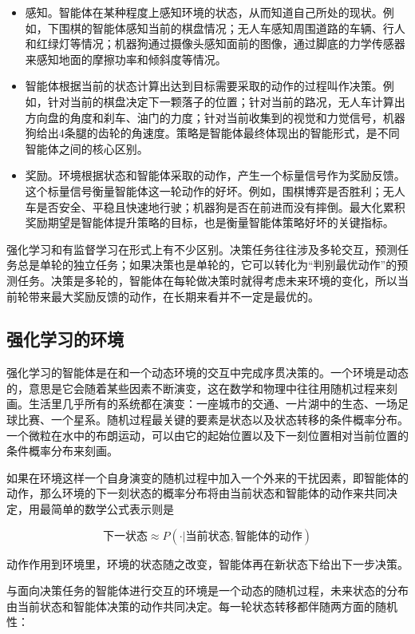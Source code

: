 \begin{itemize}
  \item 感知。智能体在某种程度上感知环境的状态，从而知道自己所处的现状。例如，下围棋的智能体感知当前的棋盘情况；无人车感知周围道路的车辆、行人和红绿灯等情况；机器狗通过摄像头感知面前的图像，通过脚底的力学传感器来感知地面的摩擦功率和倾斜度等情况。
  \item 智能体根据当前的状态计算出达到目标需要采取的动作的过程叫作决策。例如，针对当前的棋盘决定下一颗落子的位置；针对当前的路况，无人车计算出方向盘的角度和刹车、油门的力度；针对当前收集到的视觉和力觉信号，机器狗给出4条腿的齿轮的角速度。策略是智能体最终体现出的智能形式，是不同智能体之间的核心区别。
  \item 奖励。环境根据状态和智能体采取的动作，产生一个标量信号作为奖励反馈。这个标量信号衡量智能体这一轮动作的好坏。例如，围棋博弈是否胜利；无人车是否安全、平稳且快速地行驶；机器狗是否在前进而没有摔倒。最大化累积奖励期望是智能体提升策略的目标，也是衡量智能体策略好坏的关键指标。
\end{itemize}

强化学习和有监督学习在形式上有不少区别。决策任务往往涉及多轮交互，预测任务总是单轮的独立任务；如果决策也是单轮的，它可以转化为“判别最优动作”的预测任务。决策是多轮的，智能体在每轮做决策时就得考虑未来环境的变化，\colorbox{mdc1}{所以当前轮带来最大奖励反馈的动作，在长期来看并不一定是最优的}。

\subsection{强化学习的环境}

强化学习的智能体是在\colorbox{mdc1}{和一个动态环境的交互}中完成序贯决策的。一个环境是动态的，意思是它会随着某些因素不断演变，这在数学和物理中往往\colorbox{mdc1}{用随机过程来刻画}。生活里几乎所有的系统都在演变：一座城市的交通、一片湖中的生态、一场足球比赛、一个星系。随机过程最关键的要素是状态以及状态转移的条件概率分布。一个微粒在水中的布朗运动，可以由它的起始位置以及下一刻位置相对当前位置的条件概率分布来刻画。

如果在环境这样一个自身演变的随机过程中加入一个外来的干扰因素，即智能体的动作，那么环境的下一刻状态的概率分布将由当前状态和智能体的动作来共同决定，用最简单的数学公式表示则是

\[
下一状态\approx P(\cdot |当前状态,智能体的动作)
\]

动作作用到环境里，环境的状态随之改变，智能体再在新状态下给出下一步决策。

\colorbox{mdc1}{与面向决策任务的智能体进行交互的环境是一个动态的随机过程}，未来状态的分布由当前状态和智能体决策的动作共同决定。每一轮状态转移都伴随两方面的随机性：

